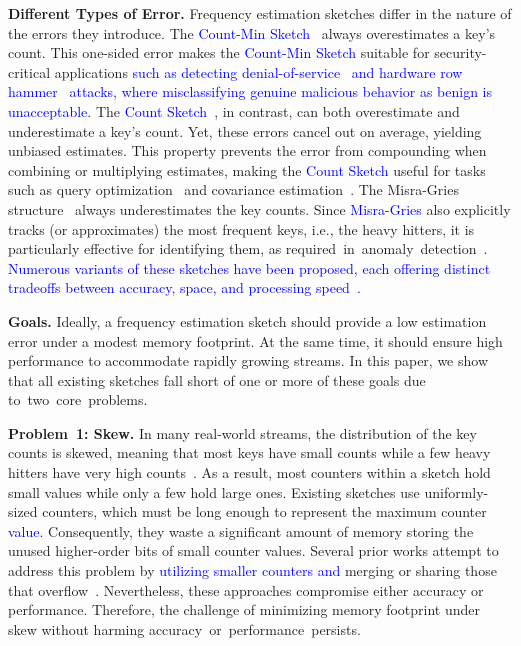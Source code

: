 \documentclass[sigconf]{acmart}
\begin{document}
\textbf{Different Types of Error.}
Frequency estimation sketches differ in the nature of the errors they
introduce. The \textcolor{blue}{Count-Min Sketch~\cite{CountMin}} always
overestimates a key's count. This one-sided error makes the
\textcolor{blue}{Count-Min Sketch} suitable for security-critical applications
\textcolor{blue}{such as detecting denial-of-service~\cite{CoDDoS} and hardware
row hammer~\cite{CoMeT} attacks, where misclassifying genuine malicious
behavior as benign is unacceptable}. The \textcolor{blue}{Count
Sketch~\cite{CountSketch}}, in contrast, can both overestimate and
underestimate a key's count. Yet, these errors cancel out on average, yielding
unbiased estimates. This property prevents the error from compounding when
combining or multiplying estimates, making the \textcolor{blue}{Count Sketch}
useful for tasks such as query
optimization~\cite{Compass,QueryOptimizationSketches,ConvolutionSketch} and
covariance estimation~\cite{ASCS}. The Misra-Gries structure~\cite{MisraGries}
always underestimates the key counts. Since \textcolor{blue}{Misra-Gries} also
explicitly tracks (or approximates) the most frequent keys, i.e., the heavy
hitters, it is particularly effective for identifying them, as
required~in~anomaly~detection~\cite{NetworkAnomalyDetection1,NetworkAnomalyDetection2}.
\textcolor{blue}{
Numerous variants of these sketches have been proposed, each offering distinct
tradeoffs between accuracy, space, and processing
speed~\cite{CountMeanMin,SALSA,BitSense,PyramidSketch,StingySketch,AdaptiveCounterSplicing,CounterTree,TreeSensing,TailoredSketch,AugmentedSketch,HeavyGuardian,HeavyKeeper,WavingSketch,ElasticSketch,MVSketch,SpaceSaving,BatchUpdateMisraGries,BitMatcher,JigsawSketch,MicroscopeSketch,PSketch,TightSketch}.
}

\textbf{Goals.}
Ideally, a frequency estimation sketch should provide a low estimation error
under a modest memory footprint. At the same time, it should ensure high
performance to accommodate rapidly growing streams. In this paper, we show that
all existing sketches fall short of one or more of these goals due
to~two~core~problems.

\textbf{Problem~1: Skew.}
In many real-world streams, the distribution of the key counts is skewed,
meaning that most keys have small counts while a few heavy hitters have very
high counts~\cite{Memento,AdditiveErrorCounters,StingySketch}. As a result,
most counters within a sketch hold small values while only a few hold large
ones. Existing sketches use uniformly-sized counters, which must be long enough
to represent the maximum counter \textcolor{blue}{value.} Consequently, they
waste a significant amount of memory storing the unused higher-order bits of
small counter values. Several prior works attempt to address this problem by
\textcolor{blue}{utilizing smaller counters and} merging or sharing those that
overflow~\cite{SALSA,BitSense,PyramidSketch,StingySketch,AdaptiveCounterSplicing,CounterTree,TreeSensing,TailoredSketch}.
Nevertheless, these approaches compromise either accuracy or performance.
Therefore, the challenge of minimizing memory footprint under skew without
harming accuracy~or~performance~persists.
\end{document}
